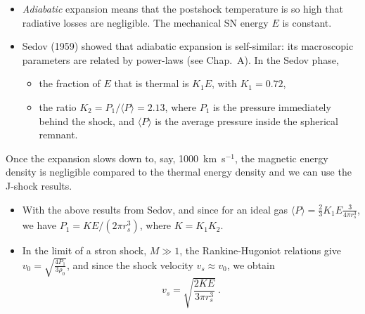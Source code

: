 \begin{itemize}

\item {\em Adiabatic} expansion means that the postshock temperature
  is so high that radiative losses are negligible. The mechanical
  SN energy $E$ is constant. 

\item Sedov (1959) showed that adiabatic expansion is self-similar:
  its macroscopic parameters are related by power-laws (see
  Chap.~A). In the Sedov phase, 
\begin{itemize}
\item the fraction of $E$ that is thermal is $K_1 E$, with $K_1 =
  0.72$, 
\item the ratio $K_2 = P_1 / \langle P \rangle = 2.13$, where
  $P_1$ is the pressure immediately behind the shock, and $\langle P
  \rangle$ is the average pressure inside the spherical remnant.

\end{itemize}
\end{itemize}


Once the expansion slows down to, say, 1000~km~s$^{-1}$, the magnetic
energy density is negligible compared to the thermal energy density
and we can use the J-shock results.

\begin{itemize}


\item With the above results from Sedov, and since for an ideal gas
  $\langle P \rangle = \frac{2}{3} K_1 E \frac{3}{4 \pi r_s^3}$, we
  have $ P_1 = K E / (2 \pi r_s^3)$, where $K = K_1 K_2$.

\item In the limit of a stron shock, $M \gg 1$, the Rankine-Hugoniot
  relations give $v_0 = \sqrt{ \frac{4  P_1}{3 \rho_0}}$, and since
  the shock velocity $v_s \approx v_0$, we obtain 
\begin{equation}
 v_s = \sqrt{ \frac{2 K E}{3 \pi r_s^3}} ~. \label{eq:adiavs}
\end{equation}


\end{itemize}




